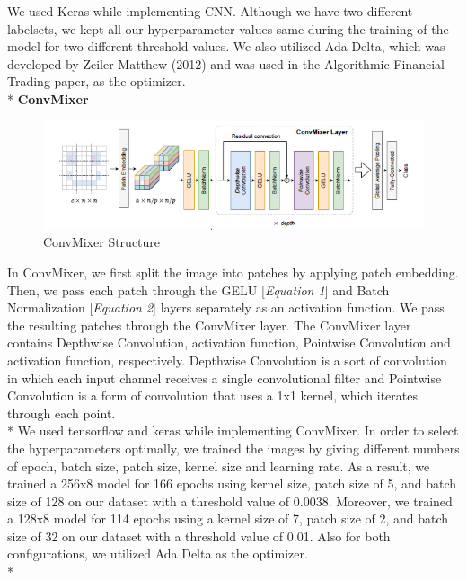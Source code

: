 \documentclass[]{article}
\begin{document}
We used Keras while implementing CNN. Although we have two different labelsets, we kept all our hyperparameter values same during the training of the model for two different threshold values. We also utilized Ada Delta, which was developed by Zeiler Matthew (2012) and was used in the Algorithmic Financial Trading paper, as the optimizer.\vspace{0.3cm} \\*
\textbf{\large ConvMixer}
\begin{figure}[H]
\begin{center}
    \includegraphics[scale=0.7]{assets/structures/convmixer.png}
    \caption{ConvMixer Structure}
\end{center}
\end{figure}
\noindent
In ConvMixer, we first split the image into patches by applying patch embedding. Then, we pass each patch through the GELU [\textit{Equation 1}] and Batch Normalization [\textit{Equation 2}] layers separately as an activation function. We pass the resulting patches through the ConvMixer layer. The ConvMixer layer contains Depthwise Convolution, activation function, Pointwise Convolution and activation function, respectively. Depthwise Convolution is a sort of convolution in which each input channel receives a single convolutional filter and Pointwise Convolution is a form of convolution that uses a 1x1 kernel, which iterates through each point.\vspace{0.2cm}\\*
We used tensorflow and keras while implementing ConvMixer. In order to select the hyperparameters optimally, we trained the images by giving different numbers of epoch, batch size, patch size, kernel size and learning rate. As a result, we trained a 256x8 model for 166 epochs using kernel size, patch size of 5, and batch size of 128 on our dataset with a threshold value of 0.0038. Moreover, we trained a 128x8 model for 114 epochs using a kernel size of 7, patch size of 2, and batch size of 32 on our dataset with a threshold value of 0.01. Also for both configurations, we utilized Ada Delta as the optimizer.\vspace{0.2cm} \\*
\end{document}
